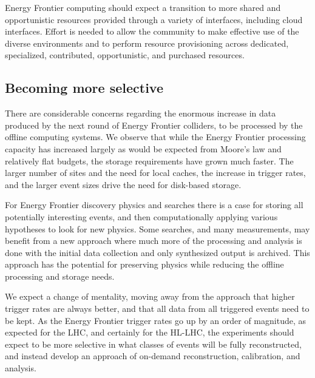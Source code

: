 Energy Frontier computing should expect a transition to more shared and opportunistic
resources provided through a variety of interfaces, including cloud
interfaces.   Effort is needed to allow the community to make effective use of
the diverse environments and to perform resource provisioning across
dedicated, specialized, contributed, opportunistic, and purchased resources.

\subsection{Becoming more selective}
There are considerable concerns regarding the enormous increase in data
produced by the next round of Energy Frontier colliders,   to be processed by the offline
computing systems.  We observe that while the Energy Frontier processing capacity has
increased largely as would be expected from Moore's law and relatively
flat budgets, the storage requirements have grown much faster.  The larger
number of sites and the need for local caches, the increase in trigger rates,
and the larger event sizes drive the need for disk-based storage.

For Energy Frontier discovery physics and searches there is a case for storing all
potentially interesting events, and then computationally  applying various
hypotheses to look for new physics.  
Some searches, and many measurements, may benefit from a
new approach where much more of the processing and analysis is done with the
initial data collection and only synthesized output is archived.
This approach has the
potential for preserving physics while reducing the offline processing and
storage needs.  

We expect a change of mentality, moving away from the approach that higher
trigger rates are always better, and that all data from  all triggered events
need to be kept.   As the Energy Frontier trigger rates go up by an order of magnitude,  as
expected for the LHC, and certainly for the HL-LHC,  the experiments
should expect to be more selective in what classes of events will be fully
reconstructed,  and instead develop an approach of on-demand reconstruction,
calibration, and analysis.


